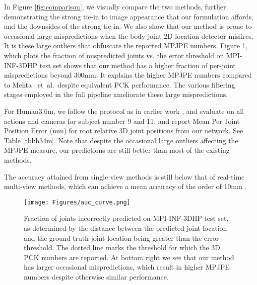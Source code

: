 \documentclass[acmtog]{acmart}
\newcommand{\etal}{~et~al.\ }
\newcommand{\change}[1]{{#1}}
\begin{document}
In Figure \ref{fig:comparison}, we visually compare the two methods, further demonstrating the strong tie-in to image appearance that our formulation affords, and the downsides of the strong tie-in. We also show that our method is prone to occasional large mispredictions when the body joint 2D location detector misfires. It is these large outliers that obfuscate the reported MPJPE numbers. \change{Figure \ref{fig:auc_curve}, which plots the fraction of mispredicted joints vs. the error threshold on MPI-INF-3DHP test set shows that our method has a higher fraction of per-joint mispredictions beyond 300mm. It explains the higher MPJPE numbers compared to Mehta \etal despite equivalent PCK performance.} The various filtering stages employed in the full pipeline ameliorate these large mispredictions.   

For Human3.6m, we follow the protocol as in earlier work \cite{pavlakos_volumetric3d_arxiv16,tekin_fusion_arxiv16,tekin_motion_comp_cvpr16}, and evaluate on all actions and cameras for subject number 9 and 11, and report Mean Per Joint Position Error (mm) for root relative 3D joint positions from our network. See Table \ref{tbl:h34m}. Note that despite the occasional large outliers affecting the MPJPE measure, our predictions are still better than most of the existing methods.

The accuracy attained from single view methods is still below that of real-time multi-view methods, which can achieve a mean accuracy of the order of 10mm \cite{stoll_fast_iccv2011}. 


\begin{figure}[]
   \centering\texttt{[image: Figures/auc\_curve.png]}
  \caption{Fraction of joints incorrectly predicted on MPI-INF-3DHP test set, as determined by the distance between the predicted joint location and the ground truth joint location being greater than the error threshold. The dotted line marks the threshold for which the 3D PCK numbers are reported. At bottom right we see that our method has larger occasional mispredictions, which result in higher MPJPE numbers despite otherwise similar performance.}
  \label{fig:auc_curve}
\end{figure}
\end{document}
